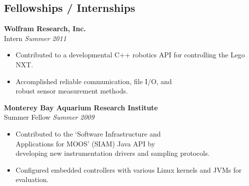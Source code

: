 \documentclass[11pt, twoside, a4paper]{article}
\begin{document}
{\begin{multicols}{2}
          \section*{Fellowships / Internships}
            \noindent
                \textbf{Wolfram Research, Inc. }\\
                 Intern \hfill \textsl{Summer 2011} \\
                \vspace{ -10px}
                \begin{itemize}[noitemsep,nolistsep]
                	\item Contributed to a developmental C++ robotics API for controlling the Lego NXT. 
                	\item Accomplished reliable communication, file I/O, and \\robust sensor measurement methods. 
                \end{itemize}
                \vspace{5px}
                \textbf{Monterey Bay Aquarium Research Institute}\\
                 Summer Fellow \hfill \textsl{Summer 2009}  \\
                \vspace{ -10px}	
                \begin{itemize}[noitemsep,nolistsep]
                	\item Contributed to the `Software Infrastructure and \\Applications for MOOS' (SIAM) Java API by \\developing new instrumentation drivers and sampling protocols.
                	\item Configured embedded controllers with various Linux kernels and JVMs for evaluation.
                \end{itemize}
                \vspace{5px}
                \vfill\null
                \columnbreak
                \vspace*{ 0.6 in }

\end{multicols}}
\end{document}
